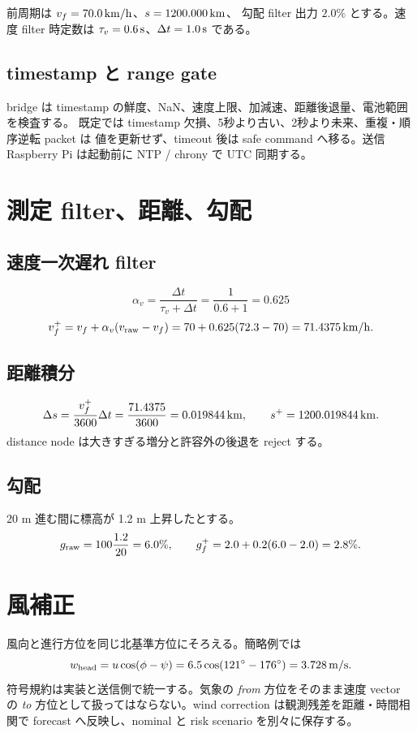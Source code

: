 前周期は $v_f=70.0\,{\rm km/h}$、$s=1200.000\,{\rm km}$、
勾配 filter 出力 $2.0\%$ とする。速度 filter 時定数は
$\tau_v=0.6\,{\rm s}$、$\Delta t=1.0\,{\rm s}$ である。

\subsection{timestamp と range gate}
bridge は timestamp の鮮度、NaN、速度上限、加減速、距離後退量、電池範囲を検査する。
既定では timestamp 欠損、5秒より古い、2秒より未来、重複・順序逆転 packet は
値を更新せず、timeout 後は safe command へ移る。送信 Raspberry Pi は起動前に
NTP / chrony で UTC 同期する。


\section{測定 filter、距離、勾配}
\subsection{速度一次遅れ filter}
\[
 \alpha_v=\frac{\Delta t}{\tau_v+\Delta t}
 =\frac{1}{0.6+1}=0.625
\]
\[
 v_f^+=v_f+\alpha_v(v_{\rm raw}-v_f)
 =70+0.625(72.3-70)=71.4375\,{\rm km/h}.
\]


\subsection{距離積分}
\[
 \Delta s=\frac{v_f^+}{3600}\Delta t
 =\frac{71.4375}{3600}=0.019844\,{\rm km},
 \qquad s^+=1200.019844\,{\rm km}.
\]
distance node は大きすぎる増分と許容外の後退を reject する。

\subsection{勾配}
20 m 進む間に標高が 1.2 m 上昇したとする。
\[
 g_{\rm raw}=100\frac{1.2}{20}=6.0\%,\qquad
 g_f^+=2.0+0.2(6.0-2.0)=2.8\%.
\]

\section{風補正}
風向と進行方位を同じ北基準方位にそろえる。簡略例では
\[
 w_{\rm head}=u\cos(\phi-\psi)
 =6.5\cos(121^\circ-176^\circ)=3.728\,{\rm m/s}.
\]
符号規約は実装と送信側で統一する。気象の \emph{from} 方位をそのまま速度 vector の
\emph{to} 方位として扱ってはならない。wind correction は観測残差を距離・時間相関で
forecast へ反映し、nominal と risk scenario を別々に保存する。

